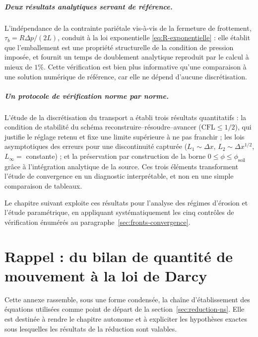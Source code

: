 \documentclass[11pt,a4paper]{report}
\newcommand{\phisol}{\phi_{\mathrm{soil}}}
\begin{document}
\paragraph{Deux résultats analytiques servant de référence.} L'indépendance de la contrainte pariétale
vis-à-vis de la fermeture de frottement, \(\tau_b = R\Delta p/(2L)\), conduit à la loi exponentielle
\eqref{eq:R-exponentielle} : elle établit que l'emballement est une propriété structurelle de la condition
de pression imposée, et fournit un temps de doublement analytique reproduit par le calcul à mieux de
\(1\%\). Cette vérification est bien plus informative qu'une comparaison à une solution numérique de
référence, car elle ne dépend d'aucune discrétisation.

\paragraph{Un protocole de vérification norme par norme.} L'étude de la discrétisation du transport a
établi trois résultats quantitatifs : la condition de stabilité du schéma reconstruire--résoudre--avancer
(\(\mathrm{CFL}\le1/2\)), qui justifie le réglage retenu et fixe une limite supérieure à ne pas franchir ;
les lois asymptotiques des erreurs pour une discontinuité capturée
(\(L_1 \sim \Delta x\), \(L_2 \sim \Delta x^{1/2}\), \(L_\infty = \) constante) ; et la préservation par
construction de la borne \(0\le\phi\le\phisol\) grâce à l'intégration analytique de la source. Ces trois
éléments transforment l'étude de convergence en un diagnostic interprétable, et non en une simple
comparaison de tableaux.

Le chapitre suivant exploite ces résultats pour l'analyse des régimes d'érosion et l'étude paramétrique,
en appliquant systématiquement les cinq contrôles de vérification énumérés au
paragraphe~\ref{sec:fronts-convergence}.


\appendix
\chapter{Rappel : du bilan de quantité de mouvement à la loi de Darcy}
\label{ann:ns}

Cette annexe rassemble, sous une forme condensée, la chaîne d'établissement des équations utilisées comme
point de départ de la section~\ref{sec:reduction-ns}. Elle est destinée à rendre le chapitre autonome et à
expliciter les hypothèses exactes sous lesquelles les résultats de la réduction sont valables.
\end{document}
